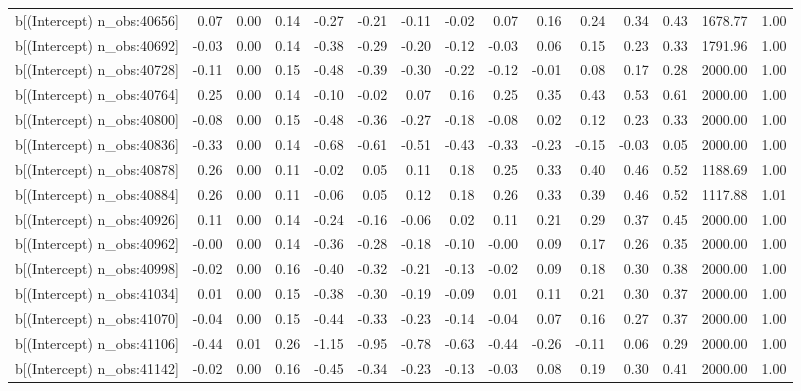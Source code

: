 \begin{table}[ht]
\begin{tabular}{rrrrrrrrrrrrrrr}
  b[(Intercept) n\_obs:40656] & 0.07 & 0.00 & 0.14 & -0.27 & -0.21 & -0.11 & -0.02 & 0.07 & 0.16 & 0.24 & 0.34 & 0.43 & 1678.77 & 1.00 \\ 
  b[(Intercept) n\_obs:40692] & -0.03 & 0.00 & 0.14 & -0.38 & -0.29 & -0.20 & -0.12 & -0.03 & 0.06 & 0.15 & 0.23 & 0.33 & 1791.96 & 1.00 \\ 
  b[(Intercept) n\_obs:40728] & -0.11 & 0.00 & 0.15 & -0.48 & -0.39 & -0.30 & -0.22 & -0.12 & -0.01 & 0.08 & 0.17 & 0.28 & 2000.00 & 1.00 \\ 
  b[(Intercept) n\_obs:40764] & 0.25 & 0.00 & 0.14 & -0.10 & -0.02 & 0.07 & 0.16 & 0.25 & 0.35 & 0.43 & 0.53 & 0.61 & 2000.00 & 1.00 \\ 
  b[(Intercept) n\_obs:40800] & -0.08 & 0.00 & 0.15 & -0.48 & -0.36 & -0.27 & -0.18 & -0.08 & 0.02 & 0.12 & 0.23 & 0.33 & 2000.00 & 1.00 \\ 
  b[(Intercept) n\_obs:40836] & -0.33 & 0.00 & 0.14 & -0.68 & -0.61 & -0.51 & -0.43 & -0.33 & -0.23 & -0.15 & -0.03 & 0.05 & 2000.00 & 1.00 \\ 
  b[(Intercept) n\_obs:40878] & 0.26 & 0.00 & 0.11 & -0.02 & 0.05 & 0.11 & 0.18 & 0.25 & 0.33 & 0.40 & 0.46 & 0.52 & 1188.69 & 1.00 \\ 
  b[(Intercept) n\_obs:40884] & 0.26 & 0.00 & 0.11 & -0.06 & 0.05 & 0.12 & 0.18 & 0.26 & 0.33 & 0.39 & 0.46 & 0.52 & 1117.88 & 1.01 \\ 
  b[(Intercept) n\_obs:40926] & 0.11 & 0.00 & 0.14 & -0.24 & -0.16 & -0.06 & 0.02 & 0.11 & 0.21 & 0.29 & 0.37 & 0.45 & 2000.00 & 1.00 \\ 
  b[(Intercept) n\_obs:40962] & -0.00 & 0.00 & 0.14 & -0.36 & -0.28 & -0.18 & -0.10 & -0.00 & 0.09 & 0.17 & 0.26 & 0.35 & 2000.00 & 1.00 \\ 
  b[(Intercept) n\_obs:40998] & -0.02 & 0.00 & 0.16 & -0.40 & -0.32 & -0.21 & -0.13 & -0.02 & 0.09 & 0.18 & 0.30 & 0.38 & 2000.00 & 1.00 \\ 
  b[(Intercept) n\_obs:41034] & 0.01 & 0.00 & 0.15 & -0.38 & -0.30 & -0.19 & -0.09 & 0.01 & 0.11 & 0.21 & 0.30 & 0.37 & 2000.00 & 1.00 \\ 
  b[(Intercept) n\_obs:41070] & -0.04 & 0.00 & 0.15 & -0.44 & -0.33 & -0.23 & -0.14 & -0.04 & 0.07 & 0.16 & 0.27 & 0.37 & 2000.00 & 1.00 \\ 
  b[(Intercept) n\_obs:41106] & -0.44 & 0.01 & 0.26 & -1.15 & -0.95 & -0.78 & -0.63 & -0.44 & -0.26 & -0.11 & 0.06 & 0.29 & 2000.00 & 1.00 \\ 
  b[(Intercept) n\_obs:41142] & -0.02 & 0.00 & 0.16 & -0.45 & -0.34 & -0.23 & -0.13 & -0.03 & 0.08 & 0.19 & 0.30 & 0.41 & 2000.00 & 1.00 \\ 

\end{tabular}
\end{table}
